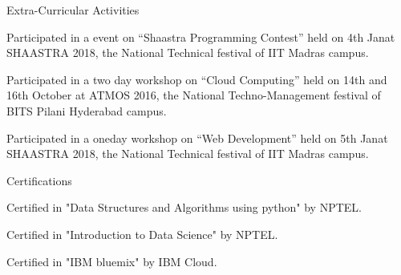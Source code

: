 \documentclass{CV_Chinnapareddy_2220570}
\begin{document}
\begin{achSection}{Extra-Curricular Activities} 

\item Participated in a event on “Shaastra Programming Contest” held on 4th Janat SHAASTRA
2018, the National Technical festival of IIT Madras campus.

\item Participated in a two day workshop on “Cloud Computing” held on 14th and 16th
October at ATMOS 2016, the National Techno-Management festival of BITS Pilani
Hyderabad campus.

\item Participated in a oneday workshop on “Web Development” held on 5th Janat
SHAASTRA 2018, the National Technical festival of IIT Madras campus.

\end{achSection}

\begin{achSection}{Certifications} 

\item Certified in "Data Structures and Algorithms using python" by NPTEL.

\item Certified in "Introduction to Data Science" by NPTEL.

\item Certified in "IBM bluemix" by IBM Cloud.

\end{achSection}
\end{document}

